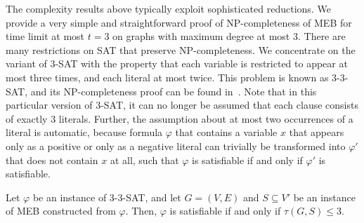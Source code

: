 The complexity results above typically exploit sophisticated reductions.
We provide a very simple and straightforward proof of NP-completeness of MEB for time limit at most $t=3$ on graphs with maximum degree at most 3.
There are many restrictions on SAT that preserve NP-completeness.
We concentrate on the variant of 3-SAT with the property that each variable is restricted to appear at most three times, and each literal at most twice. 
This problem is known as 3-3-SAT, and its NP-completeness proof can be found in~\cite{papadimitriou94}. 
Note that in this particular version of 3-SAT, it can no longer be assumed that each clause consists of exactly 3 literals.
Further, the assumption about at most two occurrences of a literal is automatic, 
because formula $\varphi$ that contains a variable $x$ that appears only as a positive or only as a negative literal can trivially be transformed into $\varphi'$ that does not contain $x$ at all, 
such that $\varphi$ is satisfiable if and only if $\varphi'$ is satisfiable.
\begin{lemma}\label{lemma:mbtred}
Let $\varphi$ be an instance of \textsc{3-3-SAT}, and let $G=(V,E)$ and $S\subseteq V'$ be an instance of MEB constructed from $\varphi$. 
Then, $\varphi$ is satisfiable if and only if $\tau(G,S)\leq 3$.
\end{lemma}
